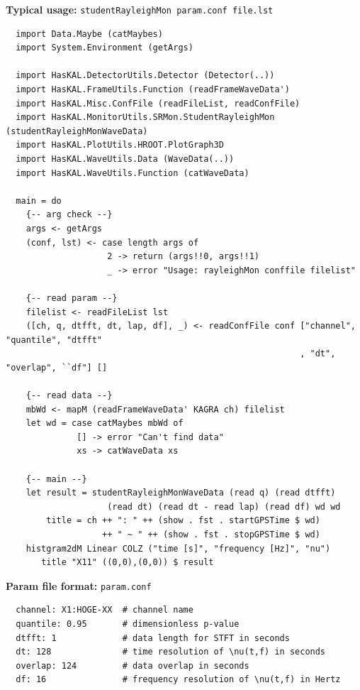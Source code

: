 {\noindent \bf Typical usage:} {\tt studentRayleighMon param.conf file.lst}
{\footnotesize
\begin{verbatim}
  import Data.Maybe (catMaybes)
  import System.Environment (getArgs)

  import HasKAL.DetectorUtils.Detector (Detector(..))
  import HasKAL.FrameUtils.Function (readFrameWaveData')
  import HasKAL.Misc.ConfFile (readFileList, readConfFile)
  import HasKAL.MonitorUtils.SRMon.StudentRayleighMon (studentRayleighMonWaveData)
  import HasKAL.PlotUtils.HROOT.PlotGraph3D
  import HasKAL.WaveUtils.Data (WaveData(..))
  import HasKAL.WaveUtils.Function (catWaveData)

  main = do
    {-- arg check --}
    args <- getArgs
    (conf, lst) <- case length args of
                    2 -> return (args!!0, args!!1)
                    _ -> error "Usage: rayleighMon conffile filelist"

    {-- read param --}
    filelist <- readFileList lst                                                                                    
    ([ch, q, dtfft, dt, lap, df], _) <- readConfFile conf ["channel", "quantile", "dtfft"
                                                          , "dt", "overlap", ``df"] []

    {-- read data --}
    mbWd <- mapM (readFrameWaveData' KAGRA ch) filelist
    let wd = case catMaybes mbWd of
              [] -> error "Can't find data"
              xs -> catWaveData xs

    {-- main --}
    let result = studentRayleighMonWaveData (read q) (read dtfft)
                    (read dt) (read dt - read lap) (read df) wd wd
        title = ch ++ ": " ++ (show . fst . startGPSTime $ wd)
                   ++ " ~ " ++ (show . fst . stopGPSTime $ wd)
    histgram2dM Linear COLZ ("time [s]", "frequency [Hz]", "nu")
       title "X11" ((0,0),(0,0)) $ result

\end{verbatim}
}

{\noindent \bf Param file format:} {\tt param.conf}
{\footnotesize
\begin{verbatim}
  channel: X1:HOGE-XX  # channel name
  quantile: 0.95       # dimensionless p-value
  dtfft: 1             # data length for STFT in seconds
  dt: 128              # time resolution of \nu(t,f) in seconds
  overlap: 124         # data overlap in seconds
  df: 16               # frequency resolution of \nu(t,f) in Hertz

\end{verbatim}
}

